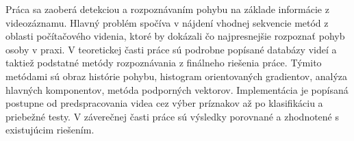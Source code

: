 Práca sa zaoberá detekciou a rozpoznávaním pohybu na základe informácie z videozáznamu. Hlavný problém spočíva
 v nájdení vhodnej sekvencie metód z oblasti počítačového videnia, ktoré by dokázali čo najpresnejšie rozpoznať pohyb
osoby v praxi. V teoretickej časti práce sú podrobne popísané databázy videí a taktiež podstatné metódy rozpoznávania 
z finálneho riešenia práce. Týmito metódami sú obraz histórie pohybu, histogram orientovaných gradientov, 
analýza hlavných komponentov, metóda podporných vektorov. Implementácia je popísaná postupne od predspracovania
 videa cez výber príznakov až po klasifikáciu a priebežné testy. V záverečnej časti práce sú výsledky porovnané a 
zhodnotené s existujúcim riešením. 